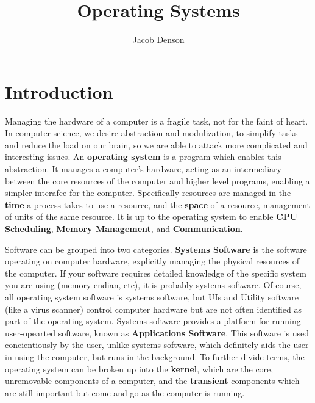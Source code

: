 

\title{Operating Systems}
\author{Jacob Denson}



\maketitle
\tableofcontents
{}

\chapter{Introduction}

Managing the hardware of a computer is a fragile task, not for the faint of heart. In computer science, we desire abstraction and modulization, to simplify tasks and reduce the load on our brain, so we are able to attack more complicated and interesting issues. An {\bf operating system} is a program which enables this abstraction. It manages a computer's hardware, acting as an intermediary between the core resources of the computer and higher level programs, enabling a simpler interafce for the computer. Specifically resources are managed in the {\bf time} a process takes to use a resource, and the {\bf space} of a resource, management of units of the same resource. It is up to the operating system to enable {\bf CPU Scheduling}, {\bf Memory Management}, and {\bf Communication}.

Software can be grouped into two categories. {\bf Systems Software} is the software operating on computer hardware, explicitly managing the physical resources of the computer. If your software requires detailed knowledge of the specific system you are using (memory endian, etc), it is probably systems software. Of course, all operating system software is systems software, but UIs and Utility software (like a virus scanner) control computer hardware but are not often identified as part of the operating system. Systems software provides a platform for running user-opearted software, known as {\bf Applications Software}. This software is used concientiously by the user, unlike systems software, which definitely aids the user in using the computer, but runs in the background. To further divide terms, the operating system can be broken up into the {\bf kernel}, which are the core, unremovable components of a computer, and the {\bf transient} components which are still important but come and go as the computer is running.

